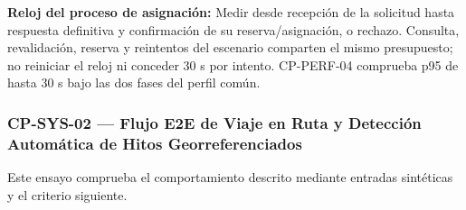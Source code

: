 \par\noindent\textbf{Reloj del proceso de asignación:} Medir desde recepción de la solicitud hasta respuesta definitiva y confirmación de su reserva/asignación, o rechazo. Consulta, revalidación, reserva y reintentos del escenario comparten el mismo presupuesto; no reiniciar el reloj ni conceder 30 s por intento. CP-PERF-04 comprueba p95 de hasta 30 s bajo las dos fases del perfil común.\par

\subsubsection*{CP-SYS-02 — Flujo E2E de Viaje en Ruta y Detección Automática de Hitos Georreferenciados}\label{sec:9-cp-sys-02}
Este ensayo comprueba el comportamiento descrito mediante entradas sintéticas y el criterio siguiente.

